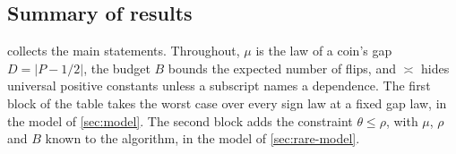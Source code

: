 \subsection{Summary of results}\label{sec:summary}
 collects the main statements. Throughout, $\mu$ is the
law of a coin's gap $D=|P-1/2|$, the budget $B$ bounds the expected number
of flips, and $\asymp$ hides universal positive constants unless a
subscript names a dependence. The first block of the table takes the worst
case over every sign law at a fixed gap law, in the model of
\cref{sec:model}. The second block adds the constraint $\theta\le\rho$,
with $\mu$, $\rho$ and $B$ known to the algorithm, in the model of
\cref{sec:rare-model}.

